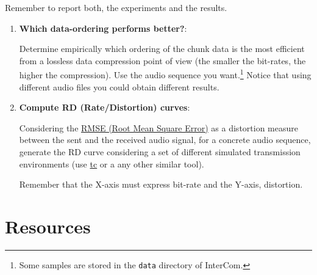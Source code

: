 Remember to report both, the experiments and the results.
\begin{enumerate}
\item \textbf{Which data-ordering performs better?}:
  
Determine empirically which ordering of the chunk data is the most
efficient from a lossless data compression point of view (the smaller
the bit-rates, the higher the compression). Use the audio sequence you
want.\footnote{Some samples are stored in the \texttt{data} directory of
  InterCom.} Notice that using different audio files you could obtain
different results.


\item \textbf{Compute RD (Rate/Distortion) curves}:
  
Considering the
\href{https://en.wikipedia.org/wiki/Root-mean-square_deviation}{RMSE
  (Root Mean Square Error)} as a distortion measure between the sent
and the received audio signal, for a concrete audio sequence,
generate the RD curve considering a set of different simulated
transmission environments (use
\href{https://vicente-gonzalez-ruiz.github.io/about_tc/}{tc} or a
any other similar tool).

Remember that the X-axis must express bit-rate and the Y-axis, distortion.

\end{enumerate}


\section{Resources}


